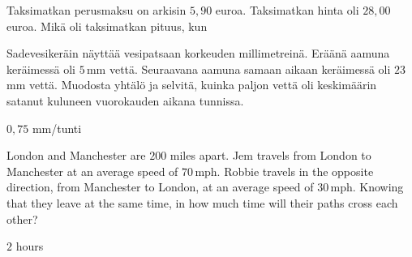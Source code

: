 \begin{tehtavasivu}
\begin{tehtava}
\begin{vastaus}
\end{vastaus}
\end{tehtava}

\begin{tehtava}
 Taksimatkan perusmaksu on arkisin $5,90$ euroa. Taksimatkan hinta oli $28,00$ euroa. Mikä oli taksimatkan pituus, kun
	\begin{vastaus}
	\end{vastaus}
\end{tehtava}


\begin{tehtava}
Sadevesikeräin näyttää vesipatsaan korkeuden millimetreinä. Eräänä aamuna keräimessä oli $5$\,mm vettä. Seuraavana aamuna samaan aikaan keräimessä oli $23$\,mm vettä. Muodosta yhtälö ja selvitä, kuinka paljon vettä oli keskimäärin satanut kuluneen vuorokauden aikana tunnissa.
	\begin{vastaus}
	$0,75$ mm/tunti
	\end{vastaus}
\end{tehtava}


\begin{tehtava}
London and Manchester are $200$ miles apart. Jem travels from London to Manchester at an average speed of $70$\,mph. Robbie travels in the opposite direction, from Manchester to London, at an average speed of $30$\,mph. Knowing that they leave at the same time, in how much time will their paths cross each other?
	\begin{vastaus}
		$2$ hours
	\end{vastaus}
\end{tehtava}


\end{tehtavasivu}
